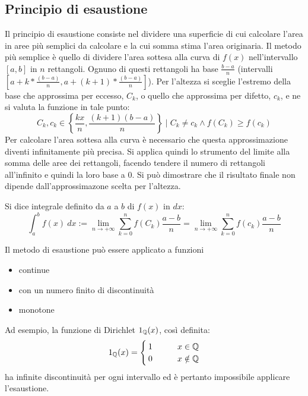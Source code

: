 \subsection{Principio di esaustione}
Il principio di esaustione consiste nel dividere una superficie di cui calcolare l'area in aree più semplici da calcolare e la cui somma stima l'area originaria. Il metodo più semplice è quello di dividere l'area sottesa alla curva di $f(x)$ nell'intervallo $[a,b]$ in $n$ rettangoli. Ognuno di questi rettangoli ha base $\frac{b-a}{n}$ (intervalli $\left[a+k*\frac{(b-a)}{n}, a+(k+1)*\frac{(b-a)}{n}\right]$). Per l'altezza si sceglie l'estremo della base che approssima per eccesso, $C_k$, o quello che approssima per difetto, $c_k$, e ne si valuta la funzione in tale punto:
\[
	C_k,c_k\in\left\{\frac{kx}{n}, \frac{(k+1)(b-a)}{n}\right\}\mid C_k\neq c_k \land f(C_k)\geq f(c_k)
\]
Per calcolare l'area sottesa alla curva è necessario che questa approssimazione diventi infinitamente più precisa. Si applica quindi lo strumento del limite alla somma delle aree dei rettangoli, facendo tendere il numero di rettangoli all'infinito e quindi la loro base a $0$. Si può dimostrare che il risultato finale non dipende dall'approssimazone scelta per l'altezza.
\begin{defin}
	Si dice integrale definito da $a$ a $b$ di $f(x)$ in $dx$:
	\[
		\int_a^b f(x)~dx:=\lim_{n\to+\infty}\sum_{k=0}^n f(C_k)\frac{a-b}{n}=\lim_{n\to+\infty}\sum_{k=0}^n f(c_k)\frac{a-b}{n}
	\]
\end{defin}
Il metodo di esaustione può essere applicato a funzioni
\begin{itemize}
	\item continue
	\item con un numero finito di discontinuità
	\item monotone
\end{itemize}
Ad esempio, la funzione di Dirichlet $1_{\mathbb{Q}}(x)$, così definita:
\[
	1_{\mathbb{Q}}(x)=
	\begin{cases}
		1\qquad & x\in\mathbb{Q}    \\
		0\qquad & x\notin\mathbb{Q}
	\end{cases}
\]
ha infinite discontinuità per ogni intervallo ed è pertanto impossibile applicare l'esaustione.

